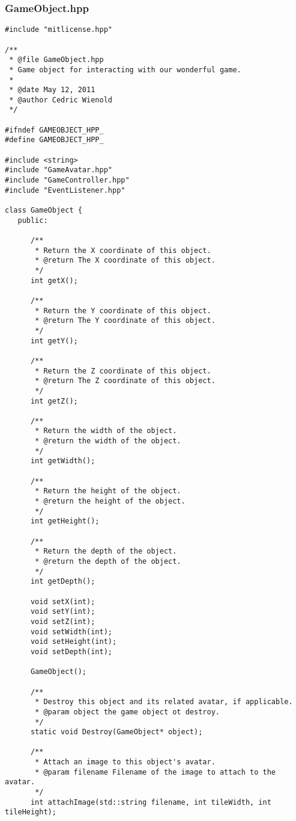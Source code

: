 \documentclass[12pt]{article}
\begin{document}
\subsubsection{GameObject.hpp}
\begin{lstlisting}[breaklines]
#include "mitlicense.hpp"

/**
 * @file GameObject.hpp
 * Game object for interacting with our wonderful game.
 *
 * @date May 12, 2011
 * @author Cedric Wienold
 */

#ifndef GAMEOBJECT_HPP_
#define GAMEOBJECT_HPP_

#include <string>
#include "GameAvatar.hpp"
#include "GameController.hpp"
#include "EventListener.hpp"

class GameObject {
   public:

      /**
       * Return the X coordinate of this object.
       * @return The X coordinate of this object.
       */
      int getX();

      /**
       * Return the Y coordinate of this object.
       * @return The Y coordinate of this object.
       */
      int getY();

      /**
       * Return the Z coordinate of this object.
       * @return The Z coordinate of this object.
       */
      int getZ();

      /**
       * Return the width of the object.
       * @return the width of the object.
       */
      int getWidth();

      /**
       * Return the height of the object.
       * @return the height of the object.
       */
      int getHeight();

      /**
       * Return the depth of the object.
       * @return the depth of the object.
       */
      int getDepth();
      
      void setX(int);
      void setY(int);
      void setZ(int);
      void setWidth(int);
      void setHeight(int);
      void setDepth(int);
      
      GameObject();
      
      /**
       * Destroy this object and its related avatar, if applicable.
       * @param object the game object ot destroy.
       */
      static void Destroy(GameObject* object);
      
      /**
       * Attach an image to this object's avatar.
       * @param filename Filename of the image to attach to the avatar.
       */
      int attachImage(std::string filename, int tileWidth, int tileHeight);
      

\end{lstlisting}
\end{document}
